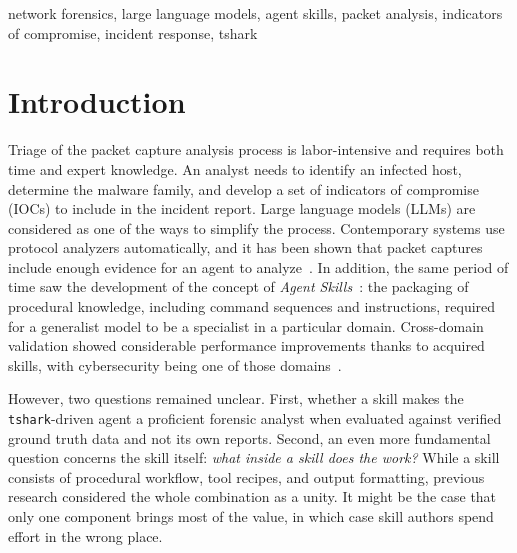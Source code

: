 \documentclass[conference]{IEEEtran}
\begin{document}
\begin{IEEEkeywords}
network forensics, large language models, agent skills, packet analysis, indicators
of compromise, incident response, tshark
\end{IEEEkeywords}

\section{Introduction}
Triage of the packet capture analysis process is labor-intensive and requires both time and
expert knowledge. An analyst needs to identify an infected host, determine the malware
family, and develop a set of indicators of compromise (IOCs) to include in the incident
report. Large language models (LLMs) are considered as one of the ways to simplify the
process. Contemporary systems use protocol analyzers automatically, and it has been shown
that packet captures include enough evidence for an agent to
analyze~\cite{cybersleuth2026,holmes2026,handoverwheel2026}. In addition, the same period of
time saw the development of the concept of \emph{Agent
Skills}~\cite{anthropicskills2026,agentskillsio2026}: the packaging of procedural knowledge,
including command sequences and instructions, required for a generalist model to be a
specialist in a particular domain. Cross-domain validation showed considerable performance
improvements thanks to acquired skills, with cybersecurity being one of those
domains~\cite{skillsbench2026}.

However, two questions remained unclear. First, whether a skill makes the
\texttt{tshark}-driven agent a proficient forensic analyst when evaluated against verified
ground truth data and not its own reports. Second, an even more fundamental question
concerns the skill itself: \emph{what inside a skill does the work?} While a skill consists
of procedural workflow, tool recipes, and output formatting, previous research considered
the whole combination as a unity. It might be the case that only one component brings most
of the value, in which case skill authors spend effort in the wrong place.
\end{document}
